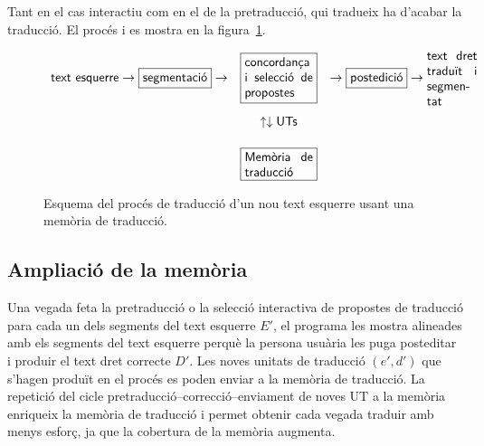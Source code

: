 Tant en el cas interactiu com en el de la pretraducció, qui tradueix ha d'acabar la traducció. El
procés i es mostra en la figura~\ref{fg:preMT}.
\begin{figure}
{\small
$$
\begin{array}{rcl}
\mbox{\textsf{text esquerre}} \to
\mbox{\framebox{\textsf{segmentació}}} \to &
\mbox{\framebox{\parbox{1.9cm}{\textsf{concordança i selecció de propostes}}}} & \to \mbox{\framebox{\textsf{postedició}}} \to \mbox{\parbox{1.4cm}{\textsf{text dret
    traduït i segmentat}}} \\[0.8cm]
& \uparrow \downarrow \mbox{\textsf{UTs}}& \\[0.5cm]
& \mbox{\framebox{\parbox{1.9cm}{\textsf{Memòria de traducció}}}} & \\
\end{array}
$$
}
\caption{Esquema del procés de traducció d'un nou text esquerre usant
  una memòria de traducció.}
\label{fg:preMT}
\end{figure}



\subsection{Ampliació de la memòria}

Una vegada feta la pretraducció o la selecció interactiva de propostes
de traducció para cada un dels segments del text esquerre $E'$, el
programa les mostra alineades amb els segments del text esquerre
perquè la persona usuària les puga posteditar i produir el text dret
correcte $D'$. Les noves unitats de traducció $(e',d')$ que s'hagen
produït en el procés es poden enviar a la memòria de traducció.
La repetició del cicle pretraducció--correcció--enviament de noves UT
a la memòria enriqueix la memòria de traducció i permet obtenir cada
vegada traduir amb menys esforç, ja que la cobertura de la memòria
augmenta.


